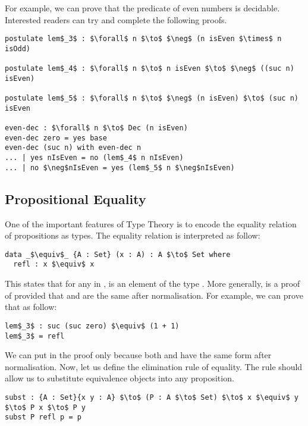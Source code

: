 \par For example, we can prove that the predicate of even numbers is
decidable. Interested readers can try and complete the following proofs. 
\begin{lstlisting}[mathescape=true,xleftmargin=.3\textwidth]
postulate lem$_3$ : $\forall$ n $\to$ $\neg$ (n isEven $\times$ n isOdd)

postulate lem$_4$ : $\forall$ n $\to$ n isEven $\to$ $\neg$ ((suc n) isEven)

postulate lem$_5$ : $\forall$ n $\to$ $\neg$ (n isEven) $\to$ (suc n) isEven

even-dec : $\forall$ n $\to$ Dec (n isEven)
even-dec zero = yes base
even-dec (suc n) with even-dec n
... | yes nIsEven = no (lem$_4$ n nIsEven)
... | no $\neg$nIsEven = yes (lem$_5$ n $\neg$nIsEven)
\end{lstlisting} 


\subsection{Propositional Equality} 
\par One of the important features of Type Theory is
to encode the equality relation of propositions as types. The
equality relation is interpreted as follow:
\begin{lstlisting}[mathescape=true,xleftmargin=.3\textwidth]
data _$\equiv$_ {A : Set} (x : A) : A $\to$ Set where
  refl : x $\equiv$ x
\end{lstlisting}

\par This states that for any  in ,  is an
element of the type . More generally,  is a
proof of  provided that  and  are the same
after normalisation. For example, we can prove that  as follow:
\begin{lstlisting}[mathescape=true,xleftmargin=.3\textwidth]
lem$_3$ : suc (suc zero) $\equiv$ (1 + 1)
lem$_3$ = refl
\end{lstlisting}

\par We can put  in the proof only because both
 and  have the same form after
normalisation. Now, let us define the elimination rule of
equality. The rule should allow us to substitute equivalence objects
into any proposition. 
\begin{lstlisting}[mathescape=true,xleftmargin=.3\textwidth]
subst : {A : Set}{x y : A} $\to$ (P : A $\to$ Set) $\to$ x $\equiv$ y $\to$ P x $\to$ P y
subst P refl p = p 
\end{lstlisting}

